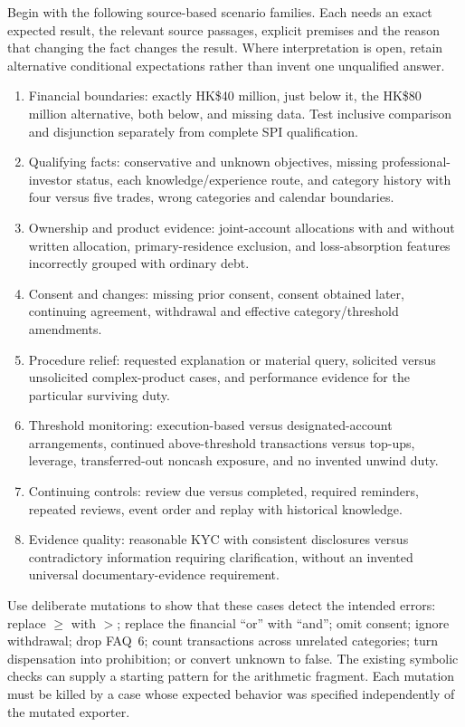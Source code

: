 Begin with the following source-based scenario families. Each needs an exact
expected result, the relevant source passages, explicit premises and the
reason that changing the fact changes the result. Where interpretation is
open, retain alternative conditional expectations rather than invent one
unqualified answer.

\begin{enumerate}
\item Financial boundaries: exactly HK\$40 million, just below it, the
HK\$80 million alternative, both below, and missing data. Test inclusive
comparison and disjunction separately from complete SPI qualification.
\item Qualifying facts: conservative and unknown objectives, missing
professional-investor status, each knowledge/experience route, and category
history with four versus five trades, wrong categories and calendar boundaries.
\item Ownership and product evidence: joint-account allocations with and
without written allocation, primary-residence exclusion, and loss-absorption
features incorrectly grouped with ordinary debt.
\item Consent and changes: missing prior consent, consent obtained later,
continuing agreement, withdrawal and effective category/threshold amendments.
\item Procedure relief: requested explanation or material query, solicited
versus unsolicited complex-product cases, and performance evidence for the
particular surviving duty.
\item Threshold monitoring: execution-based versus designated-account
arrangements, continued above-threshold transactions versus top-ups, leverage,
transferred-out noncash exposure, and no invented unwind duty.
\item Continuing controls: review due versus completed, required reminders,
repeated reviews, event order and replay with historical knowledge.
\item Evidence quality: reasonable KYC with consistent disclosures versus
contradictory information requiring clarification, without an invented
universal documentary-evidence requirement.
\end{enumerate}

Use deliberate mutations to show that these cases detect the intended errors:
replace $\geq$ with $>$; replace the financial ``or'' with ``and''; omit
consent; ignore withdrawal; drop FAQ~6; count transactions across unrelated
categories; turn dispensation into prohibition; or convert unknown to false.
The existing symbolic checks can supply a starting pattern for the arithmetic
fragment. Each mutation must be killed by a case whose expected behavior was
specified independently of the mutated exporter.

